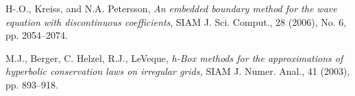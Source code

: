 \documentclass[10pt,a4paper,twoside, french]{article}
\numberwithin{equation}{section}
\numberwithin{figure}{section}
\numberwithin{table}{section}
\begin{document}
\centering
\begin{minipage}[c]{0.5\textwidth}

\end{minipage}










\begin{thebibliography}{0}

H-.O., Kreiss, and N.A. Petersson,
\emph{An embedded boundary method for the wave equation with discontinuous coefficients},
SIAM J. Sci. Comput., 28 (2006), No. 6, pp. 2054--2074.

M.J., Berger, C. Helzel, R.J., LeVeque,
\emph{h-Box methods for the approximations of hyperbolic conservation laws on irregular grids,}
SIAM J. Numer. Anal., 41 (2003), pp. 893--918.


\end{thebibliography}	
	
\end{document}
